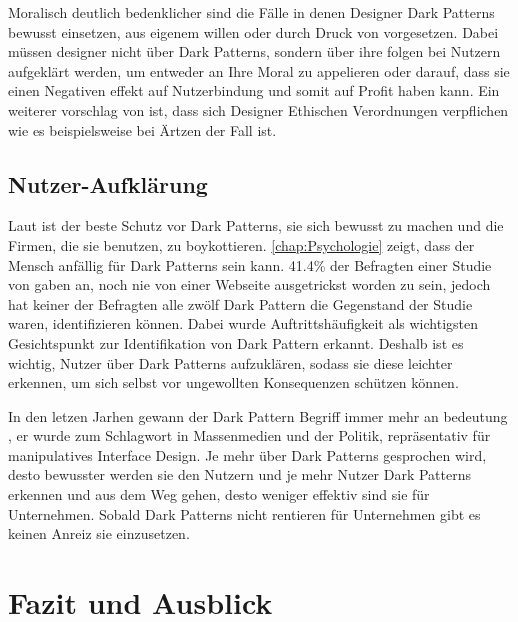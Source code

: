 \documentclass[conference,compsoc,final,a4paper]{IEEEtran}
\begin{document}
Moralisch deutlich bedenklicher sind die Fälle in denen Designer Dark Patterns bewusst einsetzen, aus eigenem willen oder durch Druck von vorgesetzen. Dabei müssen designer nicht über Dark Patterns, sondern über ihre folgen bei Nutzern aufgeklärt werden, um entweder an Ihre Moral zu appelieren oder darauf, dass sie einen Negativen effekt auf Nutzerbindung und somit auf Profit haben kann. Ein weiterer vorschlag von \citeauthor{Gray_2018} \autocite{Gray_2018} ist, dass sich Designer Ethischen Verordnungen verpflichen wie es beispielsweise bei Ärtzen der Fall ist. 

\subsection{Nutzer-Aufklärung}
Laut \citeauthor{Brignull} \autocite{Brignull} ist der beste Schutz vor Dark Patterns, sie sich bewusst zu machen und die Firmen, die sie benutzen, zu boykottieren. \autoref{chap:Psychologie} zeigt, dass der Mensch anfällig für Dark Patterns sein kann. 41.4\% der Befragten einer Studie von \citeauthor{M.Bhoot2020} \autocite{M.Bhoot2020} gaben an, noch nie von einer Webseite ausgetrickst worden zu sein, jedoch hat keiner der Befragten alle zwölf Dark Pattern die Gegenstand der Studie waren, identifizieren können. Dabei wurde Auftrittshäufigkeit als wichtigsten Gesichtspunkt zur Identifikation von Dark Pattern erkannt. Deshalb ist es wichtig, Nutzer über Dark Patterns aufzuklären, sodass sie diese leichter erkennen, um sich selbst vor ungewollten Konsequenzen schützen können.

In den letzen Jarhen gewann der Dark Pattern Begriff immer mehr an bedeutung \autocite{Chivukula_2019}, er wurde zum Schlagwort in Massenmedien und der Politik, repräsentativ für manipulatives Interface Design. Je mehr über Dark Patterns gesprochen wird, desto bewusster werden sie den Nutzern und je mehr Nutzer Dark Patterns erkennen und aus dem Weg gehen, desto weniger effektiv sind sie für Unternehmen. Sobald Dark Patterns nicht rentieren für Unternehmen gibt es keinen Anreiz sie einzusetzen.

\section{Fazit und Ausblick}
\end{document}
